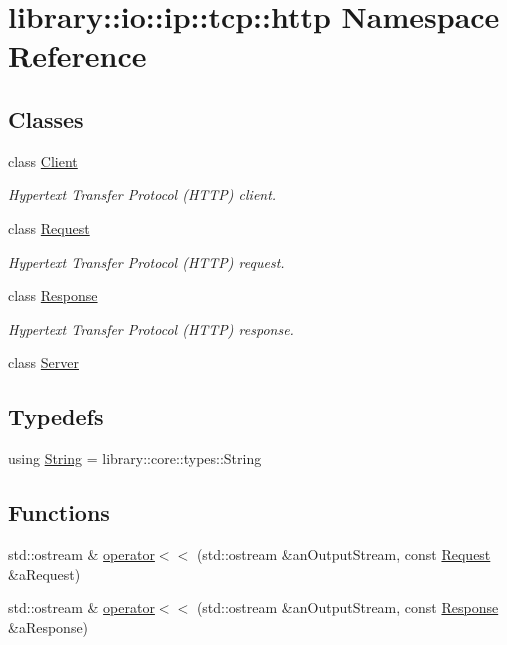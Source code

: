 \hypertarget{namespacelibrary_1_1io_1_1ip_1_1tcp_1_1http}{}\section{library\+:\+:io\+:\+:ip\+:\+:tcp\+:\+:http Namespace Reference}
\label{namespacelibrary_1_1io_1_1ip_1_1tcp_1_1http}
\subsection*{Classes}
\begin{DoxyCompactItemize}
\item 
class \hyperlink{classlibrary_1_1io_1_1ip_1_1tcp_1_1http_1_1_client}{Client}
\begin{DoxyCompactList}\small\item\em Hypertext Transfer Protocol (H\+T\+TP) client. \end{DoxyCompactList}\item 
class \hyperlink{classlibrary_1_1io_1_1ip_1_1tcp_1_1http_1_1_request}{Request}
\begin{DoxyCompactList}\small\item\em Hypertext Transfer Protocol (H\+T\+TP) request. \end{DoxyCompactList}\item 
class \hyperlink{classlibrary_1_1io_1_1ip_1_1tcp_1_1http_1_1_response}{Response}
\begin{DoxyCompactList}\small\item\em Hypertext Transfer Protocol (H\+T\+TP) response. \end{DoxyCompactList}\item 
class \hyperlink{classlibrary_1_1io_1_1ip_1_1tcp_1_1http_1_1_server}{Server}
\end{DoxyCompactItemize}
\subsection*{Typedefs}
\begin{DoxyCompactItemize}
\item 
using \hyperlink{namespacelibrary_1_1io_1_1ip_1_1tcp_1_1http_a1c435ea1e3614d52139da88a36632815}{String} = library\+::core\+::types\+::\+String
\end{DoxyCompactItemize}
\subsection*{Functions}
\begin{DoxyCompactItemize}
\item 
std\+::ostream \& \hyperlink{namespacelibrary_1_1io_1_1ip_1_1tcp_1_1http_add264b969711b177e74280f190aff9ef}{operator$<$$<$} (std\+::ostream \&an\+Output\+Stream, const \hyperlink{classlibrary_1_1io_1_1ip_1_1tcp_1_1http_1_1_request}{Request} \&a\+Request)
\item 
std\+::ostream \& \hyperlink{namespacelibrary_1_1io_1_1ip_1_1tcp_1_1http_a242e1bfe1e53cc6a8f0bc10e7d7e2ad3}{operator$<$$<$} (std\+::ostream \&an\+Output\+Stream, const \hyperlink{classlibrary_1_1io_1_1ip_1_1tcp_1_1http_1_1_response}{Response} \&a\+Response)
\end{DoxyCompactItemize}



